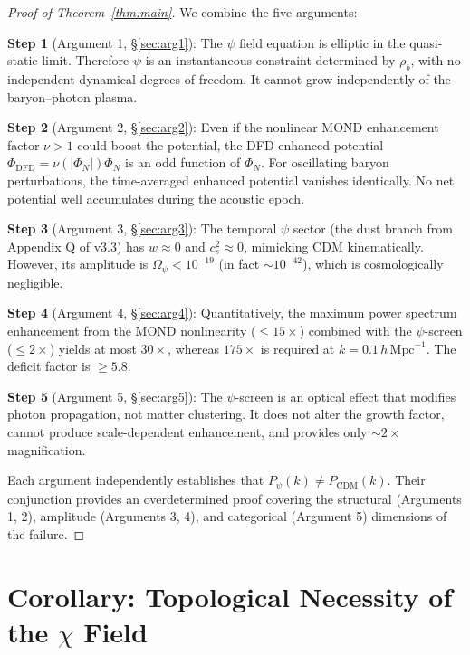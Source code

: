 \documentclass[12pt,a4paper]{article}
\newcommand{\hMpc}{\,h\,\mathrm{Mpc}^{-1}}
\begin{document}
\begin{proof}[Proof of Theorem~\ref{thm:main}]
We combine the five arguments:

\textbf{Step 1} (Argument 1, \S\ref{sec:arg1}): The $\psi$ field equation
is elliptic in the quasi-static limit. Therefore $\psi$ is an instantaneous
constraint determined by $\rho_b$, with no independent dynamical degrees
of freedom. It cannot grow independently of the baryon--photon plasma.

\textbf{Step 2} (Argument 2, \S\ref{sec:arg2}): Even if the nonlinear
MOND enhancement factor $\nu > 1$ could boost the potential, the
DFD enhanced potential $\Phi_{\mathrm{DFD}} = \nu(|\Phi_N|)\Phi_N$ is
an odd function of $\Phi_N$. For oscillating baryon perturbations,
the time-averaged enhanced potential vanishes identically. No net
potential well accumulates during the acoustic epoch.

\textbf{Step 3} (Argument 3, \S\ref{sec:arg3}): The temporal $\psi$
sector (the dust branch from Appendix Q of v3.3) has $w \approx 0$ and
$c_s^2 \approx 0$, mimicking CDM kinematically. However, its amplitude
is $\Omega_\psi < 10^{-19}$ (in fact $\sim 10^{-42}$), which is
cosmologically negligible.

\textbf{Step 4} (Argument 4, \S\ref{sec:arg4}): Quantitatively, the
maximum power spectrum enhancement from the MOND nonlinearity
($\leq 15\times$) combined with the $\psi$-screen ($\leq 2\times$)
yields at most $30\times$, whereas $175\times$ is required at
$k = 0.1\hMpc$. The deficit factor is $\geq 5.8$.

\textbf{Step 5} (Argument 5, \S\ref{sec:arg5}): The $\psi$-screen is
an optical effect that modifies photon propagation, not matter
clustering. It does not alter the growth factor, cannot produce
scale-dependent enhancement, and provides only $\sim 2\times$
magnification.

Each argument independently establishes that $P_\psi(k) \neq P_{\mathrm{CDM}}(k)$.
Their conjunction provides an overdetermined proof covering the
structural (Arguments 1, 2), amplitude (Arguments 3, 4), and
categorical (Argument 5) dimensions of the failure.
\end{proof}

\section{Corollary: Topological Necessity of the $\chi$ Field}
\label{sec:corollary}
\end{document}
